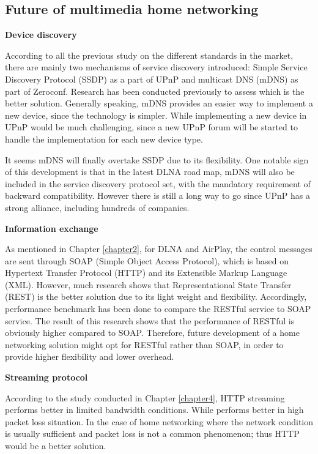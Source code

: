 \subsection{Future of multimedia home networking\label{5_3}}
\textbf{Device discovery}

According to all the previous study on the different standards in the market,
there are mainly two mechanisms of service discovery introduced: Simple Service
Discovery Protocol (SSDP) as a part of UPnP and multicast DNS (mDNS) as part of
Zeroconf. Research \cite{zeroconf_vs_upnp} has been conducted previously to
assess which is the better solution. Generally speaking, mDNS provides an
easier way to implement a new device, since the technology is simpler. While
implementing a new device in UPnP would be much challenging, since a new UPnP
forum will be started to handle the implementation for each new device type.

It seems mDNS will finally overtake SSDP due to its flexibility. One notable
sign of this development is that in the latest DLNA road map, mDNS will also be
included in the service discovery protocol set, with the mandatory requirement
of backward compatibility. However there is still a long way to go since UPnP
has a strong alliance, including hundreds of companies.

\textbf{Information exchange}

As mentioned in Chapter \ref{chapter2}, for DLNA and AirPlay, the control
messages are sent through SOAP (Simple Object Access Protocol), which is based on
Hypertext Transfer Protocol (HTTP) and its Extensible Markup Language (XML).
However, much research \cite{restful_webservice} shows that Representational
State Transfer (REST) is the better solution due to its light weight and
flexibility. Accordingly, performance benchmark \cite{performance_restful_saop}
has been done to compare the RESTful service to SOAP service. The result of this
research shows that the performance of RESTful is obviously higher compared to
SOAP. Therefore, future development of a home networking solution might opt for
RESTful rather than SOAP, in order to provide higher flexibility and lower
overhead.

\textbf{Streaming protocol}

According to the study conducted in Chapter \ref{chapter4}, HTTP streaming
performs better in limited bandwidth conditions. While performs better in high
packet loss situation. In the case of home networking where the network
condition is usually sufficient and packet loss is not a common phenomenon; thus
HTTP would be a better solution.

